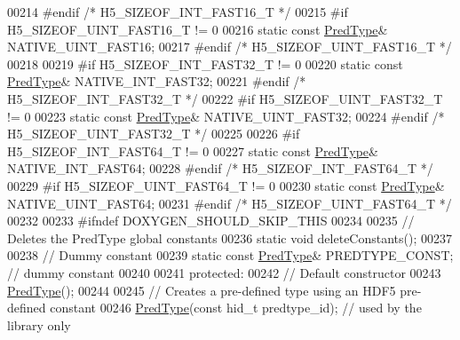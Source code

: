 \begin{DoxyCode}
00214 \textcolor{preprocessor}{#endif }\textcolor{comment}{/* H5\_SIZEOF\_INT\_FAST16\_T */}\textcolor{preprocessor}{}
00215 \textcolor{preprocessor}{#if H5\_SIZEOF\_UINT\_FAST16\_T != 0}
00216         \textcolor{keyword}{static} \textcolor{keyword}{const} \hyperlink{class_h5_1_1_pred_type}{PredType}& NATIVE\_UINT\_FAST16;
00217 \textcolor{preprocessor}{#endif }\textcolor{comment}{/* H5\_SIZEOF\_UINT\_FAST16\_T */}\textcolor{preprocessor}{}
00218 
00219 \textcolor{preprocessor}{#if H5\_SIZEOF\_INT\_FAST32\_T != 0}
00220         \textcolor{keyword}{static} \textcolor{keyword}{const} \hyperlink{class_h5_1_1_pred_type}{PredType}& NATIVE\_INT\_FAST32;
00221 \textcolor{preprocessor}{#endif }\textcolor{comment}{/* H5\_SIZEOF\_INT\_FAST32\_T */}\textcolor{preprocessor}{}
00222 \textcolor{preprocessor}{#if H5\_SIZEOF\_UINT\_FAST32\_T != 0}
00223         \textcolor{keyword}{static} \textcolor{keyword}{const} \hyperlink{class_h5_1_1_pred_type}{PredType}& NATIVE\_UINT\_FAST32;
00224 \textcolor{preprocessor}{#endif }\textcolor{comment}{/* H5\_SIZEOF\_UINT\_FAST32\_T */}\textcolor{preprocessor}{}
00225 
00226 \textcolor{preprocessor}{#if H5\_SIZEOF\_INT\_FAST64\_T != 0}
00227         \textcolor{keyword}{static} \textcolor{keyword}{const} \hyperlink{class_h5_1_1_pred_type}{PredType}& NATIVE\_INT\_FAST64;
00228 \textcolor{preprocessor}{#endif }\textcolor{comment}{/* H5\_SIZEOF\_INT\_FAST64\_T */}\textcolor{preprocessor}{}
00229 \textcolor{preprocessor}{#if H5\_SIZEOF\_UINT\_FAST64\_T != 0}
00230         \textcolor{keyword}{static} \textcolor{keyword}{const} \hyperlink{class_h5_1_1_pred_type}{PredType}& NATIVE\_UINT\_FAST64;
00231 \textcolor{preprocessor}{#endif }\textcolor{comment}{/* H5\_SIZEOF\_UINT\_FAST64\_T */}\textcolor{preprocessor}{}
00232 
00233 \textcolor{preprocessor}{#ifndef DOXYGEN\_SHOULD\_SKIP\_THIS}
00234 
00235         \textcolor{comment}{// Deletes the PredType global constants}
00236         \textcolor{keyword}{static} \textcolor{keywordtype}{void} deleteConstants();
00237 
00238         \textcolor{comment}{// Dummy constant}
00239         \textcolor{keyword}{static} \textcolor{keyword}{const} \hyperlink{class_h5_1_1_pred_type}{PredType}& PREDTYPE\_CONST; \textcolor{comment}{// dummy constant}
00240 
00241    \textcolor{keyword}{protected}:
00242         \textcolor{comment}{// Default constructor}
00243         \hyperlink{class_h5_1_1_pred_type}{PredType}();
00244 
00245         \textcolor{comment}{// Creates a pre-defined type using an HDF5 pre-defined constant}
00246         \hyperlink{class_h5_1_1_pred_type}{PredType}(\textcolor{keyword}{const} hid\_t predtype\_id);  \textcolor{comment}{// used by the library only}

\end{DoxyCode}

